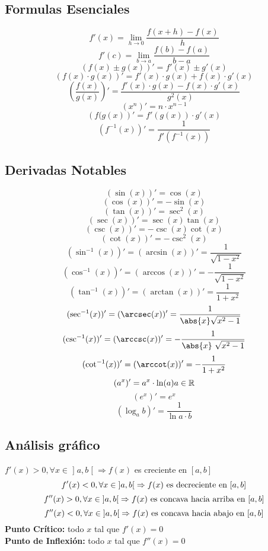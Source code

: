 \headingFormulaSheet%
\subsection*{Formulas Esenciales}%
%
\[ f'(x)=\lim_{h \to 0}\frac{f(x+h)-f(x)}{h}\]
\[ f'(c)=\lim_{b\to a}\frac{f(b)-f(a)}{b-a}\]
\[(f(x)\pm g(x))'=f'(x)\pm g'(x) \]
\[ (f(x) \cdot g(x))'=f'(x) \cdot g(x) + f(x) \cdot g'(x)\]
\[ \left(\frac{f(x)}{g(x)}\right)'= \frac{f'(x)\cdot g(x)-f(x)\cdot g'(x)}{g^{2}(x)}
\]
\[\left(x^{n} \right)'= n\cdot x^{n-1}\]
\[ \left(f(g(x)\right)'=f'(g(x))\cdot g'(x)\]
\[\left(f^{-1}(x)\right)'=\frac{1}{f'(f^{-1}(x))}\]

\subsection*{Derivadas Notables}
\[ (\sin(x))'=\cos(x) \]
\[(\cos(x))'=-\sin(x) \]
\[ (\tan(x))'=\sec^{2}(x) \]
\[(\sec(x))'=\sec(x)\tan(x)\]
\[ (\csc(x))'=-\csc(x)\cot(x)\]
\[ (\cot(x))'=-\csc^{2}(x) \]
\[ (\sin^{-1}(x))'=(\arcsin(x))'=\frac{1}{\sqrt{1-x^{2}}} \]
\[(\cos^{-1}(x))'=(\arccos(x))'=-\frac{1}{\sqrt{1-x^{2}}}\]
\[(\tan^{-1}(x))'=(\arctan(x))'=\frac{1}{1+x^{2}}\]
\[(\sec^{-1}(x))'=(\arcsec(x))'=\frac{1}{\abs{x} \sqrt{x^2-1}}\]
\[(\csc^{-1}(x))'=(\arccsc(x))'=-\frac{1}{\abs{x}\ \sqrt{x^2-1}}\]
\[(\cot^{-1}(x))'=(\arccot(x))'=-\frac{1}{1+x^{2}}\]
\[(a^{x})'=a^{x} \cdot \ln(a) \\ a\in \mathbb{R}\]
\[(e^{x})' = e^{x}\]
\[(\log_{a}{b})'=\frac{1}{\ln{a} \cdot b}\]

\subsection*{Análisis gráfico}
$f'(x)>0, \forall x\in \mathopen]a,b\mathclose[ \Rightarrow f(x)$ es creciente en $[a,b]$
\[f'(x)<0 ,\\ \forall x\in \mathopen]a,b\mathclose[\\ \Rightarrow f(x)\\ \mbox{ es decreciente en $[a,b]$}  \]
\[f''(x)>0, \forall x\in \mathopen]a,b\mathclose[ \\ \Rightarrow f(x) \mbox{ es concava hacia arriba en $[a,b]$}\]
\[f''(x)<0, \forall x\in \mathopen]a,b\mathclose[ \\ \Rightarrow f(x) \mbox{ es concava hacia abajo en $[a,b]$} \]
\textbf{Punto Crítico:} todo $x$ tal que $f'(x)=0$\\
\textbf{Punto de Inflexión:} todo $x$ tal que $f''(x)=0$

